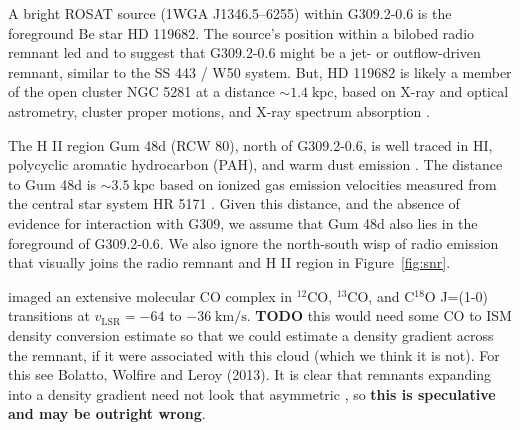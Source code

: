 \documentclass[preprint2,tighten,trackchanges]{aastex6}
\newcommand*{\mt}{\mathrm}
\newcommand*{\unit}[1]{\;\mt{#1}}  %
\newcommand*{\abt}{\mathord{\sim}} %
\newcommand*{\nH}{N_{\mathrm{H}}}
\begin{document}
A bright ROSAT source (1WGA J1346.5--6255) within G309.2-0.6 is the foreground
Be star HD 119682.
The source's position within a bilobed radio remnant led
 and  to suggest that
G309.2-0.6 might be a jet- or outflow-driven remnant, similar to the SS 443 /
W50 system.
But, HD 119682 is likely a member of the open cluster NGC 5281 at a distance
$\abt 1.4 \unit{kpc}$, based on X-ray and optical astrometry, cluster proper
motions, and X-ray spectrum absorption \citep{rakowski2006-star, safi-harb2007,
torrejon2013}.

The H II region Gum 48d (RCW 80), north of G309.2-0.6, is well traced in HI,
polycyclic aromatic hydrocarbon (PAH), and warm dust emission
\citep{karr2009}.
The distance to Gum 48d is $\abt 3.5\unit{kpc}$ based on ionized gas emission
velocities measured from the central star system HR 5171 \citep{karr2009}.
Given this distance, and the absence of evidence for interaction with G309,
we assume that Gum 48d also lies in the foreground of G309.2-0.6.
We also ignore the north-south wisp of radio emission that visually joins the
radio remnant and H II region in Figure~\ref{fig:snr}.

\citet{saito2001} imaged
an extensive molecular CO complex in ${}^{12}$CO, ${}^{13}$CO, and C${}^{18}$O
J=(1-0) transitions at $v_\mt{LSR} = -64$ to $-36 \unit{km/s}$.
\textbf{TODO} this would need some CO to ISM density conversion estimate so
that we could estimate a density gradient across the remnant, if it were
associated with this cloud (which we think it is not).
For this see Bolatto, Wolfire and Leroy (2013).
It is clear that remnants expanding into a density gradient need not look that
asymmetric \citep{hnatyk1999, williams2013}, so \textbf{this is speculative and may be
outright wrong}.


\end{document}
